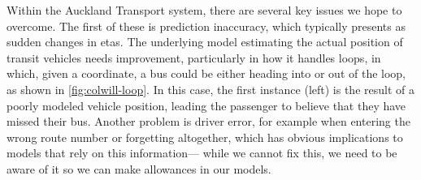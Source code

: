 \documentclass[12pt,a4paper]{article}
\begin{document}
Within the Auckland Transport system, there are several key issues we hope to overcome.
The first of these is prediction inaccuracy,
which typically presents as sudden changes in \glspl{eta}.
The underlying model estimating the actual position of transit vehicles needs improvement,
particularly in how it handles loops, in which, given a coordinate,
a bus could be either heading into or out of the loop,
as shown in \vref{fig:colwill-loop}.
In this case, the first instance (left) is the result of a poorly modeled vehicle position,
leading the passenger to believe that they have missed their bus.
Another problem is driver error, 
for example when entering the wrong route number or forgetting altogether,
which has obvious implications to models that rely on this information---%
while we cannot fix this, we need to be aware of it so we can make
allowances in our models.
\end{document}
